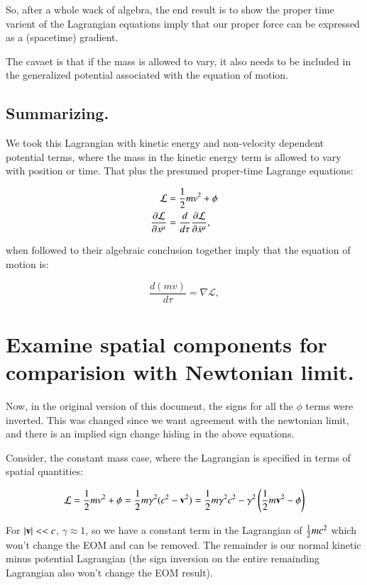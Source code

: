 \documentclass{article}      %
\newcommand{\LL}[0]{\mathcal{L}}
\newcommand{\grad}[0]{\nabla}
\newcommand{\PD}[2]{\frac{\partial {#2}}{\partial {#1}}}
\newcommand{\xdot}[0]{\dot{x}}
\begin{document}
So, after a whole wack of algebra, the end result is to show the proper time varient of the Lagrangian equations imply that our 
proper force can be expressed as a (spacetime) gradient.

The cavaet is that if the mass is allowed to vary, it also needs to be
included in the generalized potential associated with the equation of motion.

\subsection{ Summarizing. }

We took this Lagrangian with kinetic energy and non-velocity dependent potential terms, where the
mass in the kinetic energy term is allowed to vary with position or time.  That plus the
presumed proper-time Lagrange equations:

\begin{align}
\LL &= \inv{2} m v^2 + \phi \\
\PD{x^{\mu}}{\LL} &= \frac{d}{d\tau} \PD{\xdot^{\mu}}{\LL},
\end{align}

when followed to their algebraic conclusion together imply that the equation of motion is:

\begin{equation}\label{eqn:eom}
\frac{d (m v)}{d\tau} = \grad \LL,
\end{equation}

\section{ Examine spatial components for comparision with Newtonian limit. }

Now, in the original version of this document, the signs for all the $\phi$ terms were inverted.  This was changed since we want agreement with the newtonian limit, and there is an implied sign change hiding in the above equations.

Consider, the constant mass case, where the Lagrangian is specified in terms of spatial quantities:

\begin{equation*}
\LL = \inv{2} m v^2 + \phi = \inv{2} m \gamma^2 ( c^2 - \Bv^2 ) = \inv{2} m \gamma^2 c^2 - \gamma^2\left( \inv{2} m \Bv^2 - \phi \right)
\end{equation*}

For $\lvert{\mathbf{v}}\rvert << c$, $\gamma \approx 1$, so we have a constant term in the Lagrangian of $\frac{1}{2} m c^2$ which won't change the
EOM and can be removed.  The remainder is our normal kinetic minus potential Lagrangian (the sign inversion on the entire remainding Lagrangian also won't change the EOM result).
\end{document}
